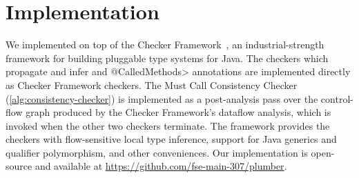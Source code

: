 \section{Implementation}
\label{sec:implementation}

We implemented \Tool on top of the Checker Framework~\cite{PapiACPE2008},
an industrial-strength framework for building pluggable type systems
for Java. The checkers which propagate and infer \MustCall and
\<@CalledMethods> annotations are implemented
directly as Checker Framework checkers.  The Must Call Consistency
Checker (\cref{alg:consistency-checker}) is
implemented as a post-analysis pass over the control-flow graph
produced by the Checker Framework's dataflow analysis, which is invoked
when the other two checkers terminate. The framework provides the
checkers with flow-sensitive local type
inference, support for Java generics and qualifier polymorphism, and
other conveniences. Our implementation is open-source and available
at \url{https://github.com/fse-main-307/plumber}.
